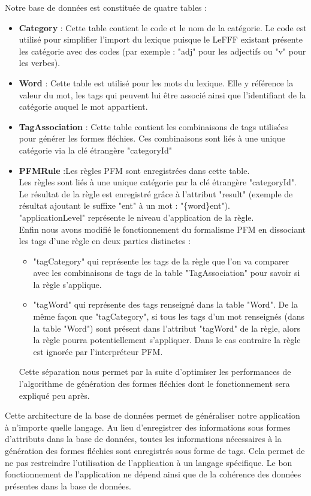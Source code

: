 \documentclass[12pt,a4paper]{article}
\begin{document}
Notre base de données est constituée de quatre tables : 
\begin{itemize}
\item \textbf{Category} : Cette table contient le code et le nom de la catégorie. 
Le code est utilisé pour simplifier l'import du lexique puisque le LeFFF existant présente les catégorie avec des codes (par exemple : "adj" pour les adjectifs ou "v" pour les verbes).
\item \textbf{Word} : Cette table est utilisé pour les mots du lexique. Elle y référence la valeur du mot, les tags qui peuvent lui être associé ainsi que l'identifiant de la catégorie auquel le mot appartient.
\item \textbf{TagAssociation} : Cette table contient les combinaisons de tags utilisées pour générer les formes fléchies. Ces combinaisons sont liés à une unique catégorie via la clé étrangère "categoryId"
\item \textbf{PFMRule} :Les règles PFM sont enregistrées dans cette table. \\
Les règles sont liés à une unique catégorie par la clé étrangère "categoryId". \\
Le résultat de la règle est enregistré grâce à l'attribut "result" (exemple de résultat ajoutant le suffixe "ent" à un mot : "\{word\}ent"). \\
"applicationLevel" représente le niveau d'application de la règle. \\
Enfin nous avons modifié le fonctionnement du formalisme PFM en dissociant les tags d'une règle en deux parties distinctes :
\begin{itemize}
\item "tagCategory" qui représente les tags de la règle que l'on va comparer avec les combinaisons de tags de la table "TagAssociation" pour savoir si la règle s'applique.

\item "tagWord" qui représente des tags renseigné dans la table "Word". De la même façon que "tagCategory", si tous les tags d'un mot renseignés (dans la table "Word") sont présent dans l'attribut "tagWord" de la règle, alors la règle pourra potentiellement s'appliquer. Dans le cas contraire la règle est ignorée par l'interpréteur PFM.
\end{itemize}
Cette séparation nous permet par la suite d'optimiser les performances de l'algorithme de génération des formes fléchies dont le fonctionnement sera expliqué peu après.

\end{itemize}
\smallbreak
Cette architecture de la base de données permet de généraliser notre application à n'importe quelle langage.
Au lieu d'enregistrer des informations sous formes d'attributs dans la base de données, toutes les informations nécessaires à la génération des formes fléchies sont enregistrés sous forme de tags. Cela permet de ne pas restreindre l'utilisation de l'application à un langage spécifique.
Le bon fonctionnement de l'application ne dépend ainsi que de la cohérence des données présentes dans la base de données.
\end{document}

